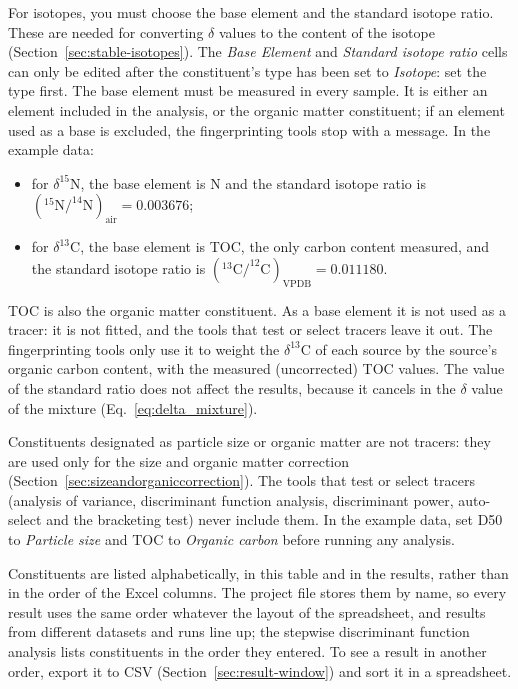 \documentclass[12pt]{report}
\begin{document}
For isotopes, you must choose the base element and the standard isotope ratio. These are needed for converting $\delta$ values to the content of the isotope (Section~\ref{sec:stable-isotopes}). The \textit{Base Element} and \textit{Standard isotope ratio} cells can only be edited after the constituent's type has been set to \textit{Isotope}: set the type first. The base element must be measured in every sample. It is either an element included in the analysis, or the organic matter constituent; if an element used as a base is excluded, the fingerprinting tools stop with a message. In the example data:
\begin{itemize}
    \item for $\delta^{15}$N, the base element is N and the standard isotope ratio is $(^{15}\mathrm{N}/^{14}\mathrm{N})_\mathrm{air} = 0.003676$;
    \item for $\delta^{13}$C, the base element is TOC, the only carbon content measured, and the standard isotope ratio is $(^{13}\mathrm{C}/^{12}\mathrm{C})_\mathrm{VPDB} = 0.011180$.
\end{itemize}
TOC is also the organic matter constituent. As a base element it is not used as a tracer: it is not fitted, and the tools that test or select tracers leave it out. The fingerprinting tools only use it to weight the $\delta^{13}$C of each source by the source's organic carbon content, with the measured (uncorrected) TOC values. The value of the standard ratio does not affect the results, because it cancels in the $\delta$ value of the mixture (Eq.~\ref{eq:delta_mixture}).

Constituents designated as particle size or organic matter are not tracers: they are used only for the size and organic matter correction (Section~\ref{sec:sizeandorganiccorrection}). The tools that test or select tracers (analysis of variance, discriminant function analysis, discriminant power, auto-select and the bracketing test) never include them. In the example data, set D50 to \textit{Particle size} and TOC to \textit{Organic carbon} before running any analysis.

Constituents are listed alphabetically, in this table and in the results, rather than in the order of the Excel columns. The project file stores them by name, so every result uses the same order whatever the layout of the spreadsheet, and results from different datasets and runs line up; the stepwise discriminant function analysis lists constituents in the order they entered. To see a result in another order, export it to CSV (Section~\ref{sec:result-window}) and sort it in a spreadsheet.
\end{document}
